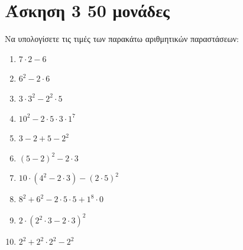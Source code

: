\documentclass[a4paper,10pt]{report}
\begin{document}
\section*{Άσκηση 3  \hfill \small{50 μονάδες}}
Να υπολογίσετε τις τιμές των παρακάτω αριθμητικών παραστάσεων:
\begin{enumerate}[1)]
 \item $7\cdot2-6$
 \item $6^{2}-2\cdot6$
 \item $3\cdot3^{2}-2^{2}\cdot5$
 \item $10^{2}-2\cdot5\cdot3\cdot1^{7}$
 \item $3-2+5-2^{2}$ 
 \item $(5-2)^{2}-2\cdot3$
 \item $10\cdot(4^{2}-2\cdot3)-(2\cdot5)^{2}$
 \item $8^{2}+6^{2}-2\cdot5\cdot5+1^{8}\cdot0$
 \item $2\cdot(2^{2}\cdot3-2\cdot3)^{2}$
 \item $2^{2}+2^{2}\cdot2^{2}-2^{2}$
\end{enumerate}



 








\end{document}
